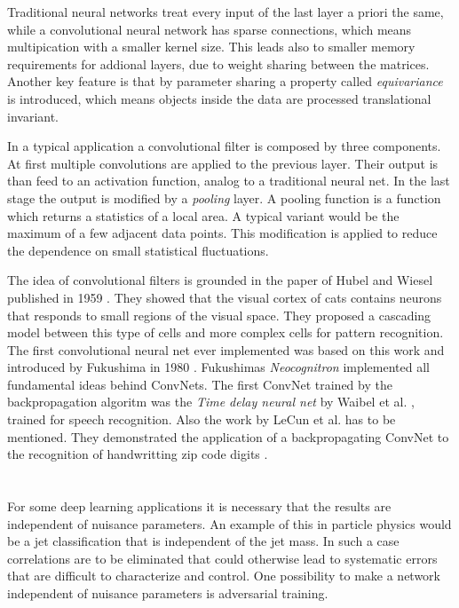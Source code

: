 \documentclass[12pt, a4paper]{thesis}
\begin{document}
Traditional neural networks treat every input of the last layer a
priori the same, while a convolutional neural network has sparse
connections, which means multipication with a smaller kernel
size. This leads also to smaller memory requirements for addional
layers, due to weight sharing between the matrices.  Another key
feature is that by parameter sharing a property called
\emph{equivariance} is introduced, which means objects inside the data
are processed translational invariant.

In a typical application a convolutional filter is composed by three
components.  At first multiple convolutions are applied to the
previous layer. Their output is than feed to an activation function,
analog to a traditional neural net.  In the last stage the output is
modified by a \emph{pooling} layer. A pooling function is a function
which returns a statistics of a local area. A typical variant would be
the maximum of a few adjacent data points. This modification is
applied to reduce the dependence on small statistical fluctuations.

The idea of convolutional filters is grounded in the paper of Hubel
and Wiesel published in 1959 \cite{hubel59}. They showed that the
visual cortex of cats contains neurons that responds to small regions
of the visual space. They proposed a cascading model between this type
of cells and more complex cells for pattern recognition. The first
convolutional neural net ever implemented was based on this work and
introduced by Fukushima in 1980 \cite{neocognitron}. Fukushimas
\emph{Neocognitron} implemented all fundamental ideas behind ConvNets.
The first ConvNet trained by the backpropagation algoritm was the
\emph{Time delay neural net} by Waibel et
al. \cite{hampshire89,waibel90}, trained for speech recognition. Also
the work by LeCun et al. has to be mentioned. They demonstrated the
application of a backpropagating ConvNet to the recognition of
handwritting zip code digits \cite{lecun89}.

\section{}

For some deep learning applications it is necessary that the results
are independent of nuisance parameters. An example of this in particle
physics would be a jet classification that is independent of the jet
mass. In such a case correlations are to be eliminated that could
otherwise lead to systematic errors that are difficult to characterize
and control. One possibility to make a network independent of nuisance
parameters is adversarial training.
\end{document}
